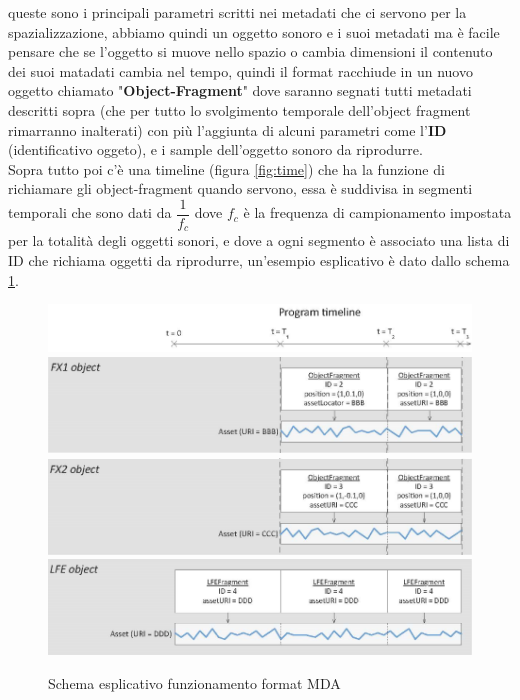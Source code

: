 \documentclass[12pt,a4paper]{report}
\begin{document}
queste sono i principali parametri scritti nei metadati che ci servono per la spazializzazione, abbiamo quindi un  oggetto sonoro e i suoi metadati ma è facile pensare che se l'oggetto si muove nello spazio o cambia dimensioni il contenuto dei suoi matadati cambia nel tempo, quindi il format racchiude in un nuovo oggetto chiamato "\textbf{Object-Fragment}" dove saranno segnati tutti metadati descritti sopra (che per tutto lo svolgimento temporale dell'object fragment rimarranno inalterati) con più l'aggiunta di alcuni parametri come l'\textbf{ID} (identificativo oggeto), e i sample dell'oggetto sonoro da riprodurre.\\

Sopra tutto poi c'è una timeline (figura \ref{fig:time}) che ha la funzione di richiamare gli object-fragment quando servono, essa è suddivisa in segmenti temporali che sono dati da $\dfrac{1}{f_c}$ dove $f_c$ è la frequenza di campionamento impostata per la totalità degli oggetti sonori, e dove a ogni segmento è associato una lista di ID che richiama oggetti da riprodurre, un'esempio esplicativo è dato dallo schema \ref{fig:object}.\\

\begin{figure}[htbp]
	\centering
	\includegraphics[scale=0.50]{figures/timeline.png}\\
	\includegraphics[scale=0.50]{figures/object1.png}\\
	\includegraphics[scale=0.50]{figures/object2.png}\\
	\includegraphics[scale=0.50]{figures/object3.png}
	\caption {Schema esplicativo funzionamento format MDA} 
	\label{fig:object}
	\end{figure}
\end{document}
